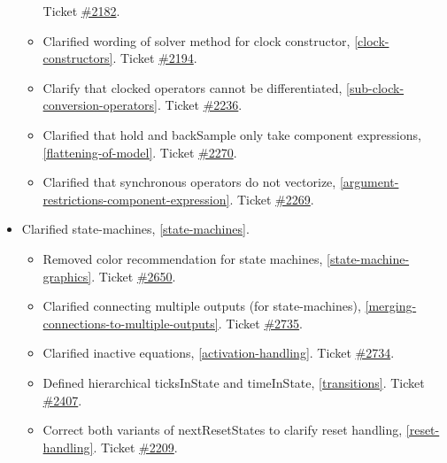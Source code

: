 \begin{itemize}
\begin{itemize}
Ticket \href{https://github.com/modelica/ModelicaSpecification/issues/2182}{\#2182}.
\item Clarified wording of solver method for clock constructor, \cref{clock-constructors}.
Ticket \href{https://github.com/modelica/ModelicaSpecification/issues/2194}{\#2194}.
\item Clarify that clocked operators cannot be differentiated, \cref{sub-clock-conversion-operators}.
Ticket \href{https://github.com/modelica/ModelicaSpecification/issues/2236}{\#2236}.
\item Clarified that hold and backSample only take component expressions, \cref{flattening-of-model}.
Ticket \href{https://github.com/modelica/ModelicaSpecification/issues/2270}{\#2270}.
\item Clarified that synchronous operators do not vectorize, \cref{argument-restrictions-component-expression}.
Ticket \href{https://github.com/modelica/ModelicaSpecification/issues/2269}{\#2269}.
\end{itemize}

\item Clarified state-machines, \cref{state-machines}.
\begin{itemize}
\item Removed color recommendation for state machines, \cref{state-machine-graphics}.
Ticket \href{https://github.com/modelica/ModelicaSpecification/issues/2650}{\#2650}.
\item Clarified connecting multiple outputs (for state-machines), \cref{merging-connections-to-multiple-outputs}.
Ticket \href{https://github.com/modelica/ModelicaSpecification/pull/2735}{\#2735}.
\item Clarified inactive equations, \cref{activation-handling}.
Ticket \href{https://github.com/modelica/ModelicaSpecification/pull/2734}{\#2734}.
\item Defined hierarchical ticksInState and timeInState, \cref{transitions}.
Ticket \href{https://github.com/modelica/ModelicaSpecification/issues/2407}{\#2407}.
\item Correct both variants of nextResetStates to clarify reset handling, \cref{reset-handling}.
Ticket \href{https://github.com/modelica/ModelicaSpecification/issues/2209}{\#2209}.
\end{itemize}



\end{itemize}
